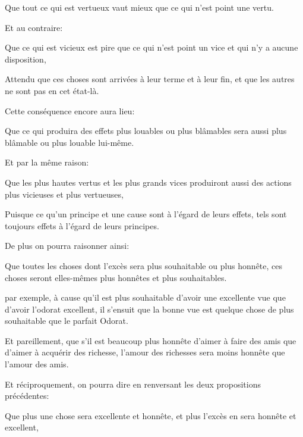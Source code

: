 \begin{emphpar}
    Que tout ce qui est vertueux vaut mieux que ce qui n'est point une vertu.
\end{emphpar}

Et au contraire:

\begin{emphpar}
    Que ce qui est vicieux est pire que ce qui n'est point un vice et qui n'y a aucune disposition,
\end{emphpar}

Attendu que ces choses sont arrivées à leur terme et à leur fin, et que les autres ne sont pas en cet état-là.

\bigbreak

Cette conséquence encore aura lieu:

\begin{emphpar}
    Que ce qui produira des effets plus louables ou plus blâmables sera aussi plus blâmable ou plus louable
	lui-même.
\end{emphpar}

Et par la même raison:

\begin{emphpar}
    Que les plus hautes vertus et les plus grands vices produiront aussi des actions plus vicieuses et plus
	vertueuses,
\end{emphpar}

Puisque ce qu'un principe et une cause sont à l’égard de leurs effets, tels sont toujours effets à l'égard de
leurs principes.

\bigbreak

De plus on pourra raisonner ainsi:

\begin{emphpar}
    Que toutes les choses dont l'excès sera plus souhaitable ou plus honnête, ces choses seront elles-mêmes
	plus honnêtes et plus souhaitables.
\end{emphpar}

par exemple, à cause qu'il est plus souhaitable d'avoir une excellente vue que d'avoir l'odorat excellent, il
s'ensuit que la bonne vue est quelque chose de plus souhaitable que le parfait Odorat.

Et pareillement, que s'il est beaucoup plus honnête d'aimer à faire des amis que d'aimer à acquérir des richesse,
l'amour des richesses sera moins honnête que l'amour des amis.

Et réciproquement, on pourra dire en renversant les deux propositions précédentes:

\begin{emphpar}
    Que plus une chose sera excellente et honnête, et plus l'excès en sera honnête et excellent,
\end{emphpar}

